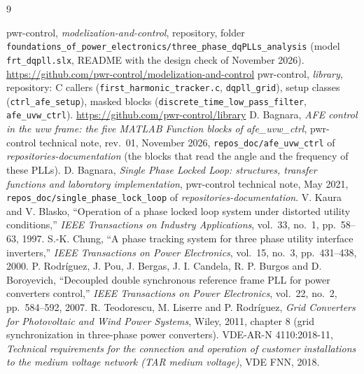 \documentclass[11pt,a4paper]{scrartcl}
\newcommand{\code}[1]{\texttt{#1}}
\newcommand{\us}{\_\allowbreak}  %
\begin{document}
\begin{onehalfspace}
\begin{thebibliography}{9}
	\raggedright
	 pwr-control, \emph{modelization-and-control}, repository, folder \code{foundations\us of\us power\us electronics/\allowbreak three\us phase\us dqPLLs\us analysis} (model \code{frt\_dqpll.slx}, README with the design check of November 2026). \url{https://github.com/pwr-control/modelization-and-control}
	 pwr-control, \emph{library}, repository: C callers (\code{first\_harmonic\_tracker.c}, \code{dqpll\_grid}), setup classes (\code{ctrl\_afe\_setup}), masked blocks (\code{discrete\_time\_low\_pass\_filter}, \code{afe\_uvw\_ctrl}). \url{https://github.com/pwr-control/library}
	 D. Bagnara, \emph{AFE control in the uvw frame: the five MATLAB Function blocks of afe\_uvw\_ctrl}, pwr-control technical note, rev.~01, November 2026, \code{repos\_doc/afe\_uvw\_ctrl} of \emph{repositories-documentation} (the blocks that read the angle and the frequency of these PLLs).
	 D. Bagnara, \emph{Single Phase Locked Loop: structures, transfer functions and laboratory implementation}, pwr-control technical note, May 2021, \code{repos\_doc/single\_phase\_lock\_loop} of \emph{repositories-documentation}.
	 V. Kaura and V. Blasko, ``Operation of a phase locked loop system under distorted utility conditions,'' \emph{IEEE Transactions on Industry Applications}, vol.~33, no.~1, pp.~58--63, 1997.
	 S.-K. Chung, ``A phase tracking system for three phase utility interface inverters,'' \emph{IEEE Transactions on Power Electronics}, vol.~15, no.~3, pp.~431--438, 2000.
	 P. Rodr\'iguez, J. Pou, J. Bergas, J. I. Candela, R. P. Burgos and D. Boroyevich, ``Decoupled double synchronous reference frame PLL for power converters control,'' \emph{IEEE Transactions on Power Electronics}, vol.~22, no.~2, pp.~584--592, 2007.
	 R. Teodorescu, M. Liserre and P. Rodr\'iguez, \emph{Grid Converters for Photovoltaic and Wind Power Systems}, Wiley, 2011, chapter 8 (grid synchronization in three-phase power converters).
	 VDE-AR-N 4110:2018-11, \emph{Technical requirements for the connection and operation of customer installations to the medium voltage network (TAR medium voltage)}, VDE FNN, 2018.
\end{thebibliography}

\end{onehalfspace}
\end{document}
